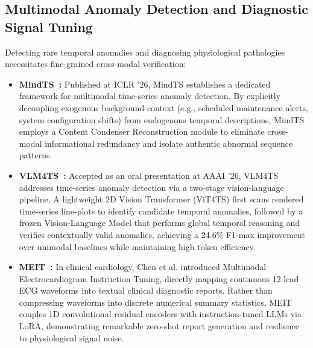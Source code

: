 \subsection{Multimodal Anomaly Detection and Diagnostic Signal Tuning}
Detecting rare temporal anomalies and diagnosing physiological pathologies necessitates fine-grained cross-modal verification:
\begin{itemize}
    \item \textbf{MindTS~\cite{Zhang2026MindTS}:} Published at ICLR '26, MindTS establishes a dedicated framework for multimodal time-series anomaly detection. By explicitly decoupling exogenous background context (e.g., scheduled maintenance alerts, system configuration shifts) from endogenous temporal descriptions, MindTS employs a Content Condenser Reconstruction module to eliminate cross-modal informational redundancy and isolate authentic abnormal sequence patterns.
    \item \textbf{VLM4TS~\cite{Li2026VLM4TS}:} Accepted as an oral presentation at AAAI '26, VLM4TS addresses time-series anomaly detection via a two-stage vision-language pipeline. A lightweight 2D Vision Transformer (ViT4TS) first scans rendered time-series line-plots to identify candidate temporal anomalies, followed by a frozen Vision-Language Model that performs global temporal reasoning and verifies contextually valid anomalies, achieving a 24.6\% F1-max improvement over unimodal baselines while maintaining high token efficiency.
    \item \textbf{MEIT~\cite{Chen2024MEIT}:} In clinical cardiology, Chen et al. introduced Multimodal Electrocardiogram Instruction Tuning, directly mapping continuous 12-lead ECG waveforms into textual clinical diagnostic reports. Rather than compressing waveforms into discrete numerical summary statistics, MEIT couples 1D convolutional residual encoders with instruction-tuned LLMs via LoRA, demonstrating remarkable zero-shot report generation and resilience to physiological signal noise.
\end{itemize}

